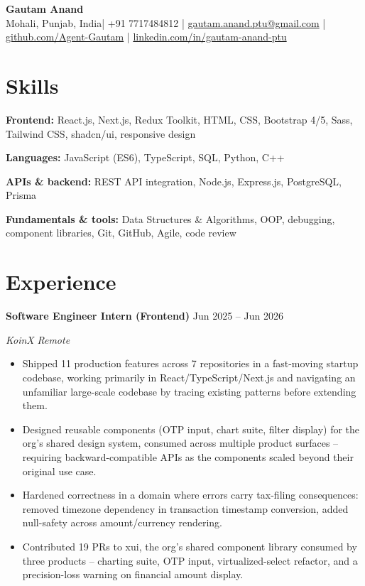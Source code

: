 \documentclass[letterpaper,10.5pt]{article}
\newcommand{\ResumeHeader}[2]{%
  \begin{center}
    {\Huge\bfseries #1}\\[5pt]
    {\small #2}%
  \end{center}\vspace{-6pt}}
\newcommand{\Entry}[4]{%
  \textbf{#1} \hfill {\small #2}\par
  \textit{\small #3} \hfill {\small\textit{#4}}\par\vspace{-1pt}}
\newenvironment{Bullets}
  {\begin{itemize}[leftmargin=1.15em,itemsep=1.5pt,parsep=0pt,topsep=3pt]\small}
  {\end{itemize}\vspace{3pt}}
\newcommand{\SkillRow}[2]{{\small \textbf{#1:} #2}\par\vspace{1.5pt}}
\newcommand{\HeaderCity}{Mohali, Punjab, India}
\begin{document}
\ResumeHeader{Gautam Anand}
  {\HeaderCity \;|\; +91 7717484812 \;|\;
   \href{mailto:gautam.anand.ptu@gmail.com}{gautam.anand.ptu@gmail.com} \;|\;
   \href{https://github.com/Agent-Gautam}{github.com/Agent-Gautam} \;|\;
   \href{https://www.linkedin.com/in/gautam-anand-ptu}{linkedin.com/in/gautam-anand-ptu}}

\section{Skills}
\SkillRow{Frontend}{React.js, Next.js, Redux Toolkit, HTML, CSS, Bootstrap 4/5, Sass, Tailwind CSS, shadcn/ui, responsive design}
\SkillRow{Languages}{JavaScript (ES6), TypeScript, SQL, Python, C++}
\SkillRow{APIs \& backend}{REST API integration, Node.js, Express.js, PostgreSQL, Prisma}
\SkillRow{Fundamentals \& tools}{Data Structures \& Algorithms, OOP, debugging, component libraries, Git, GitHub, Agile, code review}

\section{Experience}
\Entry{Software Engineer Intern (Frontend)}{Jun 2025 -- Jun 2026}{KoinX}{Remote}
\begin{Bullets}
  \item Shipped 11 production features across 7 repositories in a fast-moving startup codebase, working primarily in React/TypeScript/Next.js and navigating an unfamiliar large-scale codebase by tracing existing patterns before extending them.
  \item Designed reusable components (OTP input, chart suite, filter display) for the org's shared design system, consumed across multiple product surfaces -- requiring backward-compatible APIs as the components scaled beyond their original use case.
  \item Hardened correctness in a domain where errors carry tax-filing consequences: removed timezone dependency in transaction timestamp conversion, added null-safety across amount/currency rendering.
  \item Contributed 19 PRs to xui, the org's shared component library consumed by three products -- charting suite, OTP input, virtualized-select refactor, and a precision-loss warning on financial amount display.
\end{Bullets}
\end{document}

